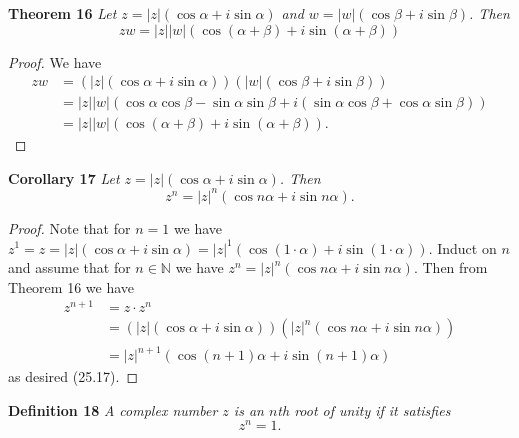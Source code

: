 \documentclass{article}
\begin{document}
\begin{flushleft}
\textbf{Theorem 16}
\textsl{Let $z = |z| (\cos \alpha + i \sin \alpha)$ and $w = |w| (\cos \beta + i \sin \beta)$. Then
\[
zw = |z||w| (\cos (\alpha + \beta) + i \sin (\alpha + \beta))
\]}
\begin{proof}
We have
\begin{align*}
zw &= (|z| (\cos \alpha + i \sin \alpha)) (|w| (\cos \beta + i \sin \beta)) \\
    &= |z||w| (\cos \alpha \cos \beta - \sin \alpha \sin \beta + i (\sin \alpha \cos \beta + \cos \alpha \sin \beta)) \\
    &= |z||w| (\cos (\alpha+\beta) + i \sin (\alpha + \beta)).
\end{align*}
\end{proof}

\textbf{Corollary 17}
\textsl{Let $z = |z| (\cos \alpha + i \sin \alpha)$. Then
\[
z^n = |z|^n (\cos n \alpha + i \sin n \alpha).
\]}
\begin{proof}
Note that for $n=1$ we have $z^1 = z = |z| (\cos \alpha + i \sin \alpha) = |z|^1 (\cos (1 \cdot \alpha) + i \sin (1 \cdot \alpha))$. Induct on $n$ and assume that for $n \in \mathbb{N}$ we have $z^n = |z|^n (\cos n \alpha + i \sin n \alpha)$. Then from Theorem 16 we have
\begin{align*}
z^{n+1} &= z \cdot z^n \\
	   &= (|z| (\cos \alpha + i \sin \alpha)) (|z|^n (\cos n \alpha + i \sin n \alpha)) \\
	   &= |z|^{n+1} (\cos (n+1) \alpha + i \sin (n+1) \alpha)
\end{align*}
as desired (25.17).
\end{proof}

\textbf{Definition 18}
\textsl{A complex number $z$ is an $n$th root of unity if it satisfies
\[
z^n = 1.
\]}\newline


\end{flushleft}
\end{document}
